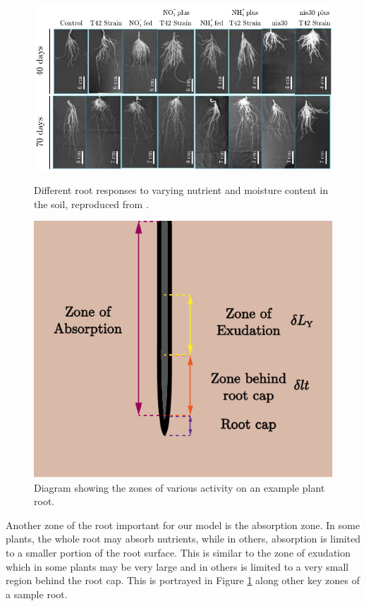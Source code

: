 \documentclass[11pt]{article}
\numberwithin{equation}{section}
\begin{document}
\begin{figure}
\centering
\begin{minipage}{.45\textwidth}
    \centering
    \includegraphics[width=\linewidth]{Figures/rootMorphology.pdf}
    \caption{ Different root responses to varying nutrient and moisture content in the soil, reproduced from \cite{PURNOBASUKI20182012}.}
    \label{fig:roots}
\end{minipage}%
\hfill
\begin{minipage}{.45\textwidth}
  \centering
    \includegraphics[width=.6\textwidth]{Figures/ZonesDiagram-plot.pdf}
    \caption{Diagram showing the zones of various activity on an example plant root.}
    \label{fig:zones}
\end{minipage}
\end{figure}

Another zone of the root important for our model is the absorption zone. In some plants, the whole root may absorb nutrients, while in others, absorption is limited to a smaller portion of the root surface. This is similar to the zone of exudation which in some plants may be very large and in others is limited to a very small region behind the root cap. This is portrayed in Figure \ref{fig:zones} along other key zones of a sample root.
\end{document}
